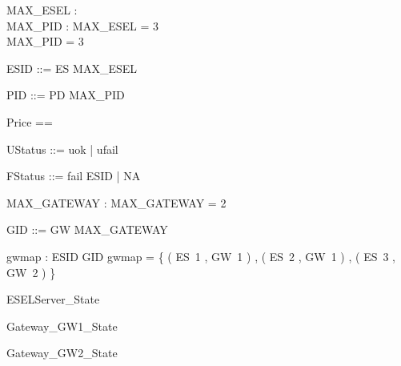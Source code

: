 \documentclass{article}
\begin{document}

\begin{axdef}
	MAX\_ESEL : \nat \\
 MAX\_PID : \nat 
\where
 MAX\_ESEL = 3 \\
 MAX\_PID = 3
\end{axdef}

\begin{zed}
	ESID ::= ES  \upto MAX\_ESEL \rdata
\end{zed}

\begin{zed}
	PID ::= PD  \upto MAX\_PID \rdata
\end{zed}

\begin{zed}
	Price == \nat
\end{zed}

\begin{zed}
	UStatus ::= uok | ufail
\end{zed}

\begin{zed}
	FStatus ::= fail \ldata ESID \rdata | NA
\end{zed}

\begin{axdef}
	MAX\_GATEWAY : \nat 
\where
 MAX\_GATEWAY = 2
\end{axdef}

\begin{zed}
	GID ::= GW  \upto MAX\_GATEWAY \rdata
\end{zed}

\begin{axdef}
	gwmap : ESID \fun GID 
\where
 gwmap = \{ ( ES~1 , GW~1 ) , ( ES~2 , GW~1 ) , ( ES~3 , GW~2 ) \}
\end{axdef}

\begin{zed}
	ESELServer\_State 
\end{zed}

\begin{zed}
	Gateway\_GW1\_State 
\end{zed}

\begin{zed}
	Gateway\_GW2\_State 
\end{zed}
\end{document}
